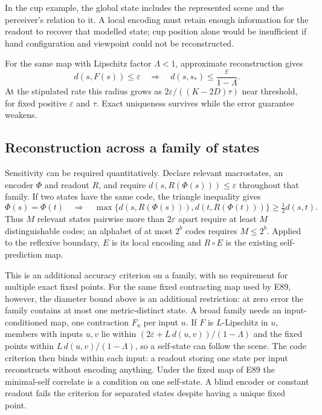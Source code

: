 \documentclass[12pt]{article}
\begin{document}
In the cup example, the global state includes the represented scene and the perceiver's relation to it. A local encoding must retain enough information for the readout to recover that modelled state; cup position alone would be insufficient if hand configuration and viewpoint could not be reconstructed.

For the same map with Lipschitz factor $\Lambda<1$, approximate reconstruction gives
\begin{equation}
 d(s,F(s))\leq\varepsilon
 \quad\Longrightarrow\quad
 d(s,s_*)\leq\frac{\varepsilon}{1-\Lambda}.
 \label{eq:approximate-self}
\end{equation}
At the stipulated rate this radius grows as $2\varepsilon/((K-2D)\tau)$ near threshold, for fixed positive $\varepsilon$ and $\tau$. Exact uniqueness survives while the error guarantee weakens.

\subsection{Reconstruction across a family of states}
\label{sec:reconstruction-family}

Sensitivity can be required quantitatively. Declare relevant macrostates, an encoder $\Phi$ and readout $R$, and require $d(s,R(\Phi(s)))\leq\varepsilon$ throughout that family. If two states have the same code, the triangle inequality gives
\begin{equation}
 \Phi(s)=\Phi(t)\quad\Longrightarrow\quad
 \max\{d(s,R(\Phi(s))),d(t,R(\Phi(t)))\}\geq\tfrac12 d(s,t).
 \label{eq:reconstruction-separation}
\end{equation}
Thus $M$ relevant states pairwise more than $2\varepsilon$ apart require at least $M$ distinguishable codes; an alphabet of at most $2^b$ codes requires $M\leq2^b$. Applied to the reflexive boundary, $E$ is its local encoding and $R\circ E$ is the existing self-prediction map.

This is an additional accuracy criterion on a family, with no requirement for multiple exact fixed points. For the same fixed contracting map used by E89, however, the diameter bound above is an additional restriction: at zero error the family contains at most one metric-distinct state. A broad family needs an input-conditioned map, one contraction $F_u$ per input $u$. If $F$ is $L$-Lipschitz in $u$, members with inputs $u,v$ lie within $(2\varepsilon+L\,d(u,v))/(1-\Lambda)$ and the fixed points within $L\,d(u,v)/(1-\Lambda)$, so a self-state can follow the scene. The code criterion then binds within each input: a readout storing one state per input reconstructs without encoding anything. Under the fixed map of E89 the minimal-self correlate is a condition on one self-state. A blind encoder or constant readout fails the criterion for separated states despite having a unique fixed point.
\end{document}
